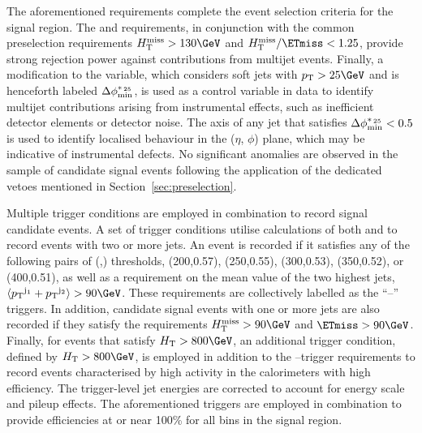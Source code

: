 The aforementioned requirements complete the event selection criteria
for the signal region. The \alphat and \bdphi requirements, in
conjunction with the common preselection requirements $\HTmiss >
130\GeV$ and $\HTmiss / \ETmiss < 1.25$, provide strong rejection
power against contributions from multijet events. Finally, a
modification to the \bdphi variable, which considers soft jets with
$\Pt > 25\GeV$ and is henceforth labeled $\mbox{$\Delta\phi^{*_{\, 25}}_{\rm min}$}$, is used as a
control variable in data to identify multijet contributions arising
from instrumental effects, such as inefficient detector elements or
detector noise. The axis of any jet that satisfies $\mbox{$\Delta\phi^{*_{\, 25}}_{\rm min}$} < 0.5$
is used to identify localised behaviour in the ($\eta$, $\phi$) plane,
which may be indicative of instrumental defects. No significant
anomalies are observed in the sample of candidate signal events
following the application of the dedicated vetoes mentioned in
Section~\ref{sec:preselection}.


Multiple trigger conditions are employed in combination to record
signal candidate events. A set of trigger conditions utilise
calculations of both \scalht and \alphat to record events with two or
more jets. An event is recorded if it satisfies any of the following
pairs of (\scalht,\alphat) thresholds, (200,0.57), (250,0.55),
(300,0.53), (350,0.52), or (400,0.51), as well as a requirement on the
mean value of the two highest \Pt jets, $\langle\Pt^{\mathrm{j_1}} +
\Pt^{\mathrm{j_2}}\rangle > 90\GeV$. These requirements are collectively
labelled as the ``\scalht--\alphat'' triggers. In addition, candidate
signal events with one or more jets are also recorded if they satisfy
the requirements $\HTmiss > 90\GeV$ and $\ETmiss > 90\GeV$. Finally,
for events that satisfy $\scalht > 800\GeV$, an additional trigger
condition, defined by $\scalht > 800\GeV$, is employed in addition to
the \scalht--\alphat trigger requirements to record events
characterised by high activity in the calorimeters with high
efficiency. The trigger-level jet energies are corrected to account
for energy scale and pileup effects. The aforementioned triggers are
employed in combination to provide efficiencies at or near 100\% for
all bins in the signal region.


